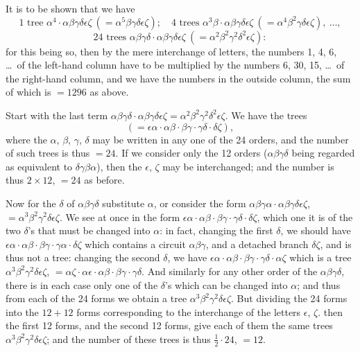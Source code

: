 \documentclass[11pt,a4paper]{book}
\begin{document}
It is to be shown that we have
\[
1\text{ tree } \alpha^4 \cdot \alpha\beta\gamma\delta\epsilon\zeta\ (= \alpha^5\beta\gamma\delta\epsilon\zeta);\quad 4\text{ trees } \alpha^3\beta \cdot \alpha\beta\gamma\delta\epsilon\zeta\ (= \alpha^4\beta^2\gamma\delta\epsilon\zeta),\ \ldots,
\]
\[
24\text{ trees } \alpha\beta\gamma\delta \cdot \alpha\beta\gamma\delta\epsilon\zeta\ (= \alpha^2\beta^2\gamma^2\delta^2\epsilon\zeta):
\]
for this being so, then by the mere interchange of letters, the numbers 1, 4, 6, \ldots\ of the left-hand column have to be multiplied by the numbers 6, 30, 15, \ldots\ of the right-hand column, and we have the numbers in the outside column, the sum of which is $= 1296$ as above.

Start with the last term $\alpha\beta\gamma\delta \cdot \alpha\beta\gamma\delta\epsilon\zeta = \alpha^2\beta^2\gamma^2\delta^2\epsilon\zeta$. We have the trees
\[
(= \epsilon\alpha \cdot \alpha\beta \cdot \beta\gamma \cdot \gamma\delta \cdot \delta\zeta),
\]
where the $\alpha$, $\beta$, $\gamma$, $\delta$ may be written in any one of the 24 orders, and the number of such trees is thus $= 24$. If we consider only the 12 orders ($\alpha\beta\gamma\delta$ being regarded as equivalent to $\delta\gamma\beta\alpha$), then the $\epsilon$, $\zeta$ may be interchanged; and the number is thus $2 \times 12$, $=24$ as before.

Now for the $\delta$ of $\alpha\beta\gamma\delta$ substitute $\alpha$, or consider the form $\alpha\beta\gamma\alpha \cdot \alpha\beta\gamma\delta\epsilon\zeta$, $= \alpha^3\beta^2\gamma^2\delta\epsilon\zeta$. We see at once in the form $\epsilon\alpha \cdot \alpha\beta \cdot \beta\gamma \cdot \gamma\delta \cdot \delta\zeta$, which one it is of the two $\delta$'s that must be changed into $\alpha$: in fact, changing the first $\delta$, we should have $\epsilon\alpha \cdot \alpha\beta \cdot \beta\gamma \cdot \gamma\alpha \cdot \delta\zeta$ which contains a circuit $\alpha\beta\gamma$, and a detached branch $\delta\zeta$, and is thus not a tree: changing the second $\delta$, we have $\epsilon\alpha \cdot \alpha\beta \cdot \beta\gamma \cdot \gamma\delta \cdot \alpha\zeta$ which is a tree $\alpha^3\beta^2\gamma^2\delta\epsilon\zeta$, $= \alpha\zeta \cdot \alpha\epsilon \cdot \alpha\beta \cdot \beta\gamma \cdot \gamma\delta$. And similarly for any other order of the $\alpha\beta\gamma\delta$, there is in each case only one of the $\delta$'s which can be changed into $\alpha$; and thus from each of the 24 forms we obtain a tree $\alpha^3\beta^2\gamma^2\delta\epsilon\zeta$. But dividing the 24 forms into the $12+12$ forms corresponding to the interchange of the letters $\epsilon$, $\zeta$. then the first 12 forms, and the second 12 forms, give each of them the same trees $\alpha^3\beta^2\gamma^2\delta\epsilon\zeta$; and the number of these trees is thus $\tfrac{1}{2} \cdot 24$, $=12$.
\end{document}

